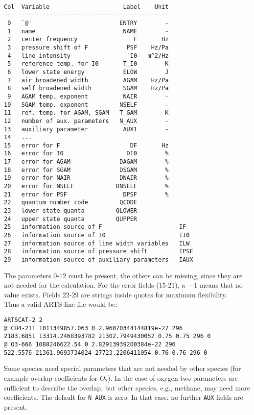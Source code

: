 \begin{verbatim}

Col  Variable                     Label    Unit     
-----------------------------------------------      
 0   `@'                         ENTRY        -     
 1   name                         NAME        -     
 2   center frequency                F       Hz     
 3   pressure shift of F           PSF    Hz/Pa    
 4   line intensity                 I0   m^2/Hz     
 5   reference temp. for I0       T_I0        K
 6   lower state energy           ELOW        J    
 7   air broadened width          AGAM    Hz/Pa     
 8   self broadened width         SGAM    Hz/Pa
 9   AGAM temp. exponent          NAIR        -     
10   SGAM temp. exponent         NSELF        - 
11   ref. temp. for AGAM, SGAM   T_GAM        K
12   number of aux. parameters   N_AUX        -
13   auxiliary parameter          AUX1        -
14   ... 
15   error for F                    DF       Hz
16   error for I0                  DI0        %
17   error for AGAM              DAGAM        %
18   error for SGAM              DSGAM        %
19   error for NAIR              DNAIR        %
20   error for NSELF            DNSELF        %
21   error for PSF                DPSF        %
22   quantum number code         QCODE           
23   lower state quanta         QLOWER            
24   upper state quanta         QUPPER            
25   information source of F                      IF
26   information source of I0                     II0
27   information source of line width variables   ILW
28   information source of pressure shift         IPSF
29   information source of auxiliary parameters   IAUX
\end{verbatim}
The parameters 0-12 must be present, the others can be missing, since
they are not needed for the calculation. For the error fields (15-21),
a~$-1$ means that no value exists. Fields 22-29 are strings inside quotes
\verb ""  for maximum flexibility.\\
Thus a valid ARTS line file would be:
\begin{verbatim}
ARTSCAT-2 2
@ CH4-211 1011349857.063 0 2.96070344144819e-27 296
2183.6851 13314.2468393782 21302.7949430052 0.75 0.75 296 0
@ O3-666 1088246622.54 0 2.82913939200384e-22 296
522.5576 21361.9693734024 27723.2206411054 0.76 0.76 296 0
\end{verbatim}
Some species need special parameters that are not needed by other
species (for example overlap coefficients for $O_2$). In the case of
oxygen two parameters are sufficient to describe the overlap, but
other species, e.g., methane, may need more coefficients. The default
for \texttt{N\_AUX} is zero. In that case, no further \texttt{AUX}
fields are present.








